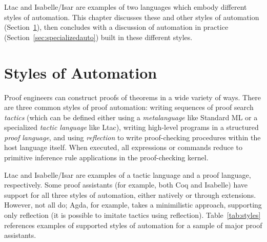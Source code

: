 Ltac and Isabelle/Isar are examples of two languages which embody different styles of automation.
This chapter discusses these and other styles of automation (Section~\ref{sec:languagesforauto}),
then concludes with a discussion of automation in practice (Section~\ref{sec:specializedauto}) built in these different styles.






\section{Styles of Automation}
\label{sec:languagesforauto}

Proof engineers can construct proofs of theorems in a wide variety of ways.
There are three common styles of proof automation:
writing sequences of proof search \textit{tactics} (which can be defined
either using a \textit{metalanguage} like Standard ML or a specialized
\textit{tactic language} like Ltac), writing high-level programs in a structured \textit{proof language},
and using \textit{reflection} to write proof-checking procedures within the host language itself.
When executed, all expressions or commands reduce to primitive
inference rule applications in the proof-checking kernel.

Ltac and Isabelle/Isar are examples of a tactic language and a proof language, respectively.
Some proof assistants (for example, both Coq and Isabelle) have
support for all three styles of automation, either natively or through
extensions. However, not all do; Agda, for example,
takes a minimilistic approach,
supporting only reflection (it is possible to imitate tactics
using reflection). Table~\ref{tab:styles}
references examples of supported styles of automation for a sample of major proof assistants.


